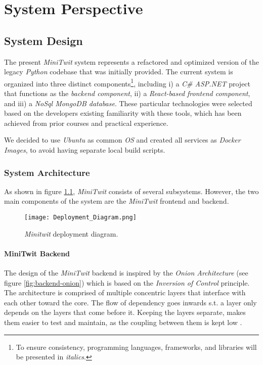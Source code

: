 \chapter{System Perspective}

\section{System Design}

The present \textit{MiniTwit} system represents a refactored and optimized version of the legacy \textit{Python} codebase that was initially provided. The current system is organized into three distinct components\footnote{To ensure consistency, programming languages, frameworks, and libraries will be presented in \textit{italics}.}, including i) a \textit{C\# ASP.NET} project that functions as the \textit{backend component}, ii) a \textit{React-based frontend component}, and iii) a \textit{NoSql MongoDB database}. These particular technologies were selected based on the developers existing familiarity with these tools, which has been achieved from prior courses and practical experience. 

We decided to use \textit{Ubuntu} as common \textit{OS} and created all services as \textit{Docker Images}, to avoid having separate local build scripts.

\subsection{System Architecture}

As shown in figure \ref{fig:deployment_diagram}, \textit{MiniTwit} consists of several subsystems. However, the two main components of the system are the \textit{MiniTwit} frontend and backend.

\begin{figure}[H]
    \centering
    \texttt{[image: Deployment\_Diagram.png]}
    \vspace{-0.8cm}
    \caption{\textit{Minitwit} deployment diagram.}
    \label{fig:deployment_diagram}
\end{figure}
\vspace{-0.3cm}

\subsubsection{MiniTwit Backend}
\label{sec:minitwit-backend-architecture}

The design of the \textit{MiniTwit} backend is inspired by the \textit{Onion Architecture} (see figure \ref{fig:backend-onion}) which is based on the \textit{Inversion of Control} principle. The architecture is comprised of multiple concentric layers that interface with each other toward the core. The flow of dependency goes inwards s.t. a layer only depends on the layers that come before it. Keeping the layers separate, makes them easier to test and maintain, as the coupling between them is kept low \cite{onion-architecture}.

